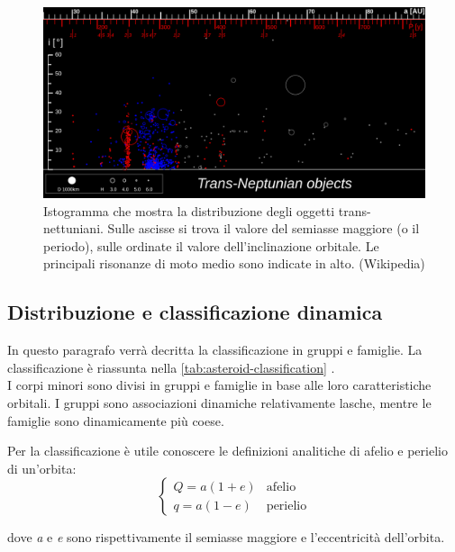 \documentclass[a4paper,11pt,openright]{book}
\begin{document}
\begin{figure}
    \centering
    \includegraphics[width=\textwidth]{figure/neptune_resonances.png}
    \caption[Risonanze di moto medio con Nettuno.]{Istogramma che mostra la distribuzione degli oggetti trans-nettuniani. Sulle ascisse si trova il valore del semiasse maggiore (o il periodo), sulle ordinate il valore dell'inclinazione orbitale. Le principali risonanze di moto medio sono indicate in alto. (Wikipedia)}
    \label{fig:neptune_resonances}
\end{figure}

\subsection{Distribuzione e classificazione dinamica}
In questo paragrafo verrà decritta la classificazione in gruppi e famiglie.
La classificazione è riassunta nella \cref{tab:asteroid-classification} .\\
I corpi minori sono divisi in gruppi e famiglie in base alle loro caratteristiche orbitali. 
I gruppi sono associazioni dinamiche relativamente lasche, mentre le famiglie sono dinamicamente più coese.

Per la classificazione è utile conoscere le definizioni analitiche di afelio e perielio di un'orbita:
\begin{equation}
    \begin{cases}
        Q=a(1+e) &\text{afelio}\\
        q=a(1-e) &\text{perielio}
    \end{cases}
\end{equation}

dove \textit{a} e \textit{e} sono rispettivamente il semiasse maggiore e l'eccentricità dell'orbita.
\end{document}
